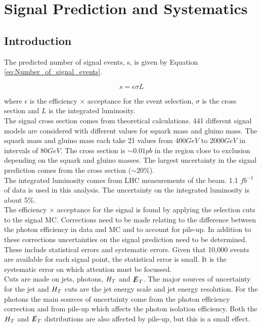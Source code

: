 \chapter{Signal Prediction and Systematics}

\section{Introduction}

The predicted number of signal events, s, is given by Equation
\ref{eq:Number_of_signal_events}.

\begin{equation}
s = \epsilon \sigma L
\label{eq:Number_of_signal_events}
\end{equation}

where $\epsilon$ is the efficiency $\times$ acceptance for the event selection,
$\sigma$ is the cross section and $L$ is the integrated luminosity. \\

The signal cross section comes from theoretical calculations. 441 different
signal models are considered with different values for squark mass and gluino 
mass. The squark mass and gluino mass each take 21 values from $400 \unit{GeV}$ 
to $2000 \unit{GeV}$ in intervals of $80 \unit{GeV}$. The cross section is $\sim 
0.01 \unit{pb}$ in the region close to exclusion depending on the squark and 
gluino masses. The largest uncertainty in the signal prediction comes from the 
cross section ($\sim 20 \unit{\%}$). \\

The integrated luminosity comes from LHC measurements of the beam. 1.1
$\unit{fb^{-1}}$ of data is used in this analysis. The uncertainty on the 
integrated luminosity is about 5\unit{\%}. \\

The efficiency $\times$ acceptance for the signal is found by applying the 
selection cuts to the signal MC. Corrections need to be made relating to the 
difference between the photon efficiency in data and MC and to account for 
pile-up. In addition to these corrections uncertainties on the signal prediction
need to be determined. These include statistical errors and systematic errors. 
Given that 10,000 events are available for each signal point, the statistical 
error is small. It is the systematic error on which attention must be focussed. 
\\

Cuts are made on jets, photons, $H_{T}$ and $\slashed{E}_{T}$. The major sources of
uncertainty for the jet and $H_{T}$ cuts are the jet energy scale and jet energy 
resolution. For the photons the main sources of uncertainty come from the photon
efficiency correction and from pile-up which affects the photon isolation 
efficiency. Both the $H_{T}$ and $\slashed{E}_{T}$ distributions are also affected by 
pile-up, but this is a small effect.

